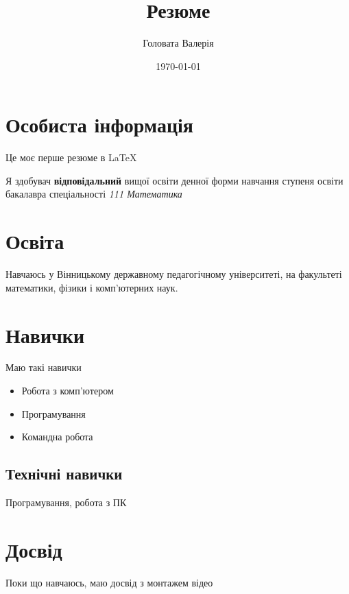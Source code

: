 \documentclass[12pt]{article}
\title{Резюме}
\author{Головата Валерія}
\date{\today}
\begin{document}
\maketitle
\tableofcontents\section{Особиста інформація} \begin{center}
Це моє перше резюме в LaTeX
\end{center}
Я здобувач \textbf{відповідальний} вищої освіти денної форми навчання ступеня освіти бакалавра спеціальності \textit{111 Математика}
\section{Освіта}
Навчаюсь у Вінницькому державному педагогічному університеті, на факультеті математики, фізики і комп'ютерних наук.
\section{Навички}
Маю такі навички \begin{itemize}
\item Робота з комп’ютером
\item Програмування
\item Командна робота
\end{itemize}
\subsection{Технічні навички} 
Програмування, робота з ПК
 \section{Досвід}
Поки що навчаюсь, маю досвід з монтажем відео
\end{document}
